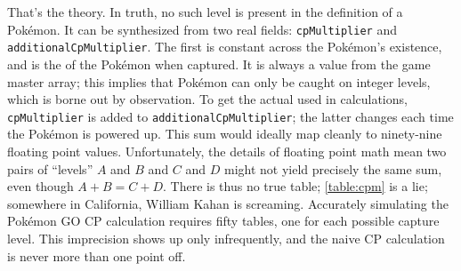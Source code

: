 That's the theory.
In truth, no such level is present in the definition of a Pokémon.
It can be synthesized from two real fields: \texttt{cpMultiplier} and \texttt{additionalCpMultiplier}.
The first is constant across the Pokémon's existence, and is the \CPM{} of the Pokémon when captured.
It is always a value from the game master array; this implies that Pokémon can only be caught on integer levels,
 which is borne out by observation.
To get the actual \CPM{} used in calculations, \texttt{cpMultiplier} is added to \texttt{additionalCpMultiplier}; the
 latter changes each time the Pokémon is powered up.
This sum would ideally map cleanly to ninety-nine floating point values.
Unfortunately, the details of floating point math mean two pairs of ``levels'' $A$ and $B$
 and $C$ and $D$ might not yield precisely the same sum, even though $A+B = C+D$.
There is thus no true \CPM{} table; \autoref{table:cpm} is a lie; somewhere in
 California, William Kahan is screaming.
Accurately simulating the Pokémon GO CP calculation requires fifty tables, one for each possible capture level.
This imprecision shows up only infrequently, and the naive CP calculation is never more than one point off.

